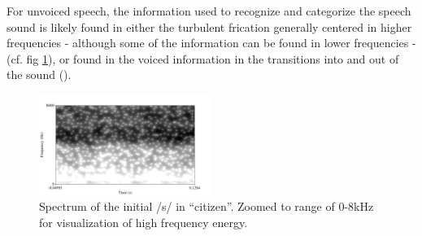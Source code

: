 \documentclass[dissertation,copyright]{uathesis}
\begin{document}
For unvoiced speech, the information used to recognize and categorize the speech sound is likely found in either the turbulent frication generally centered in higher frequencies - although some of the information can be found in lower frequencies - (cf. fig \ref{fig:spctgrm_s}), or found in the voiced information in the transitions into and out of the sound (\cite{story:10}).
%
\begin{figure}
\centering
  \includegraphics[width=0.5\textwidth]{figure/spctgrm_s.png}
  \caption{Spectrum of the initial /s/ in ``citizen''. Zoomed to range of 0-8kHz for visualization of high frequency energy.}
  \label{fig:spctgrm_s}
\end{figure}

\end{document}

